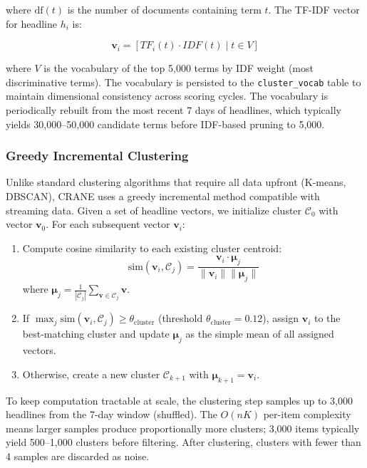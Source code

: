 where $\text{df}(t)$ is the number of documents containing term $t$. The TF-IDF vector for headline $h_i$ is:

\begin{equation}
\mathbf{v}_i = [TF_i(t) \cdot IDF(t) \mid t \in V]
\label{eq:vector}
\end{equation}

where $V$ is the vocabulary of the top 5,000 terms by IDF weight (most discriminative terms). The vocabulary is persisted to the \texttt{cluster\_vocab} table to maintain dimensional consistency across scoring cycles. The vocabulary is periodically rebuilt from the most recent 7 days of headlines, which typically yields 30,000--50,000 candidate terms before IDF-based pruning to 5,000.

\subsubsection{Greedy Incremental Clustering}

Unlike standard clustering algorithms that require all data upfront (K-means, DBSCAN), CRANE uses a greedy incremental method compatible with streaming data. Given a set of headline vectors, we initialize cluster $\mathcal{C}_0$ with vector $\mathbf{v}_0$. For each subsequent vector $\mathbf{v}_i$:

\begin{enumerate}
    \item Compute cosine similarity to each existing cluster centroid:
    \begin{equation}
    \text{sim}(\mathbf{v}_i, \mathcal{C}_j) = \frac{\mathbf{v}_i \cdot \boldsymbol{\mu}_j}{\|\mathbf{v}_i\| \|\boldsymbol{\mu}_j\|}
    \label{eq:cosine}
    \end{equation}
    where $\boldsymbol{\mu}_j = \frac{1}{|\mathcal{C}_j|} \sum_{\mathbf{v} \in \mathcal{C}_j} \mathbf{v}$.
    \item If $\max_j \text{sim}(\mathbf{v}_i, \mathcal{C}_j) \geq \theta_{\text{cluster}}$ (threshold $\theta_{\text{cluster}} = 0.12$), assign $\mathbf{v}_i$ to the best-matching cluster and update $\boldsymbol{\mu}_j$ as the simple mean of all assigned vectors.
    \item Otherwise, create a new cluster $\mathcal{C}_{k+1}$ with $\boldsymbol{\mu}_{k+1} = \mathbf{v}_i$.
\end{enumerate}

To keep computation tractable at scale, the clustering step samples up to 3,000 headlines from the 7-day window (shuffled). The $O(nK)$ per-item complexity means larger samples produce proportionally more clusters; 3,000 items typically yield 500--1,000 clusters before filtering. After clustering, clusters with fewer than 4 samples are discarded as noise.

